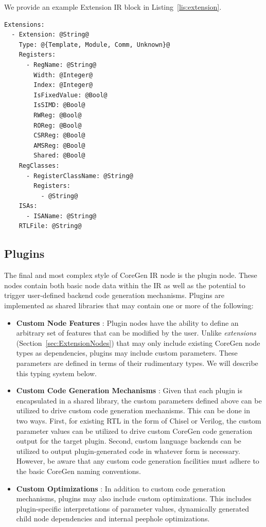 \documentclass{article}
\begin{document}
We provide an example Extension IR block in Listing~\ref{lis:extension}.  

\clearpage
\vspace{0.125in}
\begin{lstlisting}[frame=single,style=base,caption={Extension Node Definition},captionpos=b,label={lis:extension}]
Extensions:
  - Extension: @String@
    Type: @{Template, Module, Comm, Unknown}@
    Registers:
      - RegName: @String@
        Width: @Integer@
        Index: @Integer@
        IsFixedValue: @Bool@
        IsSIMD: @Bool@
        RWReg: @Bool@
        ROReg: @Bool@
        CSRReg: @Bool@
        AMSReg: @Bool@
        Shared: @Bool@
    RegClasses:
      - RegisterClassName: @String@
        Registers:
          - @String@
    ISAs:
      - ISAName: @String@
    RTLFile: @String@
\end{lstlisting}

\clearpage
\subsection{Plugins}
\label{sec:PluginNodes}

The final and most complex style of CoreGen IR node is the plugin node.  These nodes contain both 
basic node data within the IR as well as the potential to trigger user-defined backend code generation 
mechanisms.  Plugins are implemented as shared libraries that may contain one or more of the following: 

\begin{itemize}
\item \textbf{Custom Node Features} : Plugin nodes have the ability to define an arbitrary set of features that 
can be modified by the user.  Unlike \textit{extensions} (Section~\ref{sec:ExtensionNodes}) that may only 
include existing CoreGen node types as dependencies, plugins may include custom parameters.  These 
parameters are defined in terms of their rudimentary types.  We will describe this typing system below.  

\item \textbf{Custom Code Generation Mechanisms} : Given that each plugin is encapsulated in a shared 
library, the custom parameters defined above can be utilized to drive custom code generation mechanisms.  
This can be done in two ways.  First, for existing RTL in the form of Chisel or Verilog, the custom parameter 
values can be utilized to drive custom CoreGen code generation output for the target plugin.  Second, custom 
language backends can be utilized to output plugin-generated code in whatever form is necessary.  However, 
be aware that any custom code generation facilities must adhere to the basic CoreGen naming conventions.  

\item \textbf{Custom Optimizations} : In addition to custom code generation mechanisms, plugins may also 
include custom optimizations.  This includes plugin-specific interpretations of parameter values, dynamically 
generated child node dependencies and internal peephole optimizations.  
\end{itemize}
\end{document}
